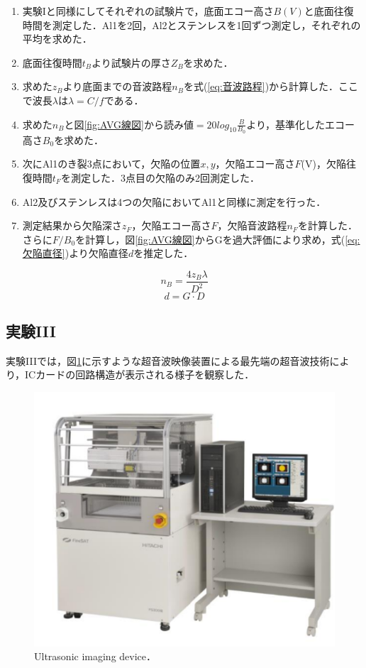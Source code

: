 \begin{enumerate}
    \item 実験Iと同様にしてそれぞれの試験片で，底面エコー高さ$B(V)$と底面往復時間を測定した．Al1を2回，Al2とステンレスを1回ずつ測定し，それぞれの平均を求めた．
    \item 底面往復時間$t_B$より試験片の厚さ$Z_B$を求めた．
    \item 求めた$z_B$より底面までの音波路程$n_B$を式(\ref{eq:音波路程})から計算した．ここで波長$\lambda$は$\lambda = C/f$である．
    \item 求めた$n_B$と図\ref{fig:AVG線図}から読み値$= 20log_{10} \frac{B}{B_0}$より，基準化したエコー高さ$B_0$を求めた．
    \item 次にAl1のき裂3点において，欠陥の位置$x, y$，欠陥エコー高さ$F$(V)，欠陥往復時間$t_F$を測定した．3点目の欠陥のみ2回測定した．
    \item Al2及びステンレスは4つの欠陥においてAl1と同様に測定を行った．
    \item 測定結果から欠陥深さ$z_F$，欠陥エコー高さ$F$，欠陥音波路程$n_F$を計算した．さらに$F/B_0$を計算し，図\ref{fig:AVG線図}からGを過大評価により求め，式(\ref{eq:欠陥直径})より欠陥直径$d$を推定した．
\end{enumerate}
\begin{equation}
    \label{eq:音波路程}
    n_B = \frac{4z_B\lambda}{D^2}
\end{equation}
\begin{equation}
    \label{eq:欠陥直径}
    d = G \cdot D
\end{equation}

\subsection{実験III}
実験IIIでは，図\ref{fig:超音波映像装置}に示すような超音波映像装置による最先端の超音波技術により，ICカードの回路構造が表示される様子を観察した．

\begin{figure}[htbp]
    \centering %
    \includegraphics[width=100truemm,clip]{fig/超音波映像装置.png}
    \caption{Ultrasonic imaging device．}
    \label{fig:超音波映像装置}
\end{figure}